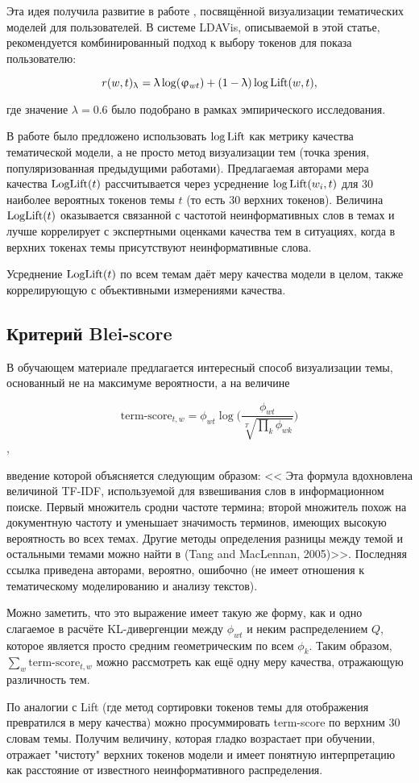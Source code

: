 Эта идея получила развитие в работе \cite{ldavis2014}, посвящённой визуализации тематических моделей для пользователей. В системе LDAVis, описываемой в этой статье, рекомендуется комбинированный подход к выбору токенов для показа пользователю:

$$r(w, t)_{\lambda} = \lambda \log(\phi_{wt}) + (1 - \lambda) \log \textup{Lift}(w, t),$$

где значение $\lambda = 0.6$ было подобрано в рамках эмпирического исследования.

В работе \cite{fan2019assessing} было предложено использовать $\log \textup{Lift}$ как метрику качества тематической модели, а не просто метод визуализации тем (точка зрения, популяризованная предыдущими работами). Предлагаемая авторами мера качества $\textup{LogLift}(t)$ рассчитывается через усреднение $\log \textup{Lift}(w_i, t)$ для 30 наиболее вероятных токенов темы $t$ (то есть 30 верхних токенов). Величина $\textup{LogLift}(t)$ оказывается связанной с частотой неинформативных слов в темах и лучше коррелирует с экспертными оценками качества тем в ситуациях, когда в верхних токенах темы присутствуют неинформативные слова.

Усреднение $\textup{LogLift}(t)$ по всем темам даёт меру качества модели в целом, также коррелирующую с объективными измерениями качества.

\subsection{Критерий Blei-score}

В обучающем материале \cite{Blei_lafferty} предлагается интересный способ визуализации темы, основанный не на максимуме вероятности, а на величине

$$\text{term-score}_{t,w} = \phi_{wt} \log \bigg( \frac{\phi_{wt}}{\sqrt[T]{\prod_k \phi_{wk}}}\bigg)$$,

введение которой объясняется следующим образом: <<
Эта формула вдохновлена величиной TF-IDF, используемой для взвешивания слов в информационном поиске. Первый
множитель сродни частоте термина; второй множитель похож
на документную частоту и уменьшает значимость терминов, имеющих высокую вероятность во всех темах. Другие методы определения разницы между
темой и остальными темами можно найти в (Tang and MacLennan, 2005)>>. Последняя ссылка приведена авторами, вероятно, ошибочно (не имеет отношения к тематическому моделированию и анализу текстов).

Можно заметить, что это выражение имеет такую же форму, как и одно слагаемое в расчёте KL-дивергенции между $\phi_{wt}$ и неким распределением $Q$, которое является просто средним геометрическим по всем $\phi_{k}$. Таким образом, $\sum_{w} \text{term-score}_{t,w}$ можно рассмотреть как ещё одну меру качества, отражающую различность тем.

По аналогии с Lift (где метод сортировки токенов темы для отображения превратился в меру качества) можно просуммировать term-score по верхним 30 словам темы. Получим величину, которая гладко возрастает при обучении, отражает "чистоту" верхних токенов модели и имеет понятную интерпретацию как расстояние от известного неинформативного распределения.


